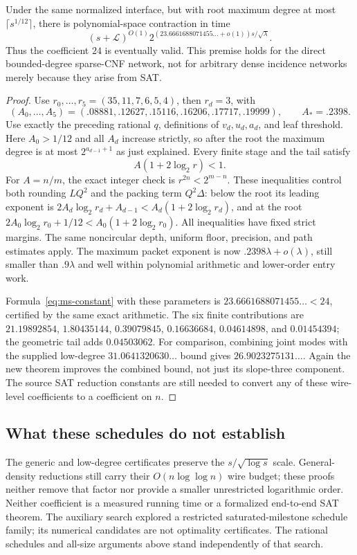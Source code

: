 \begin{theorem}
\label{thm:multistage-lowdegree}
Under the same normalized interface, but with root maximum degree at most
$\lceil s^{1/12}\rceil$, there is polynomial-space contraction in time
\[
 (s+\mathcal L)^{O(1)}
 2^{(23.6661688071455\ldots+o(1))s/\sqrt\lambda}.
\]
Thus the coefficient $24$ is eventually valid. This premise holds for the
direct bounded-degree sparse-CNF network, not for arbitrary dense incidence
networks merely because they arise from SAT.
\end{theorem}

\begin{proof}
Use $r_0,\ldots,r_5=(35,11,7,6,5,4)$, then $r_d=3$, with
\[
 (A_0,\ldots,A_5)
 =(.08881,.12627,.15116,.16206,.17717,.19999),
 \qquad A_*=.2398.
\]
Use exactly the preceding rational $q$, definitions of $v_d,u_d,a_d$, and
leaf threshold. Here $A_0>1/12$ and all $A_d$ increase strictly, so after
the root the maximum degree is at most $2^{a_{d-1}+1}$ as just explained.
Every finite stage and the tail satisfy
\[
 A(1+2\log_2r)<1.
\]
For $A=n/m$, the exact integer check is $r^{2n}<2^{m-n}$.
These inequalities control both rounding $LQ^2$ and the packing term
$Q^2\Delta$: below the root its leading exponent is
$2A_d\log_2r_d+A_{d-1}<A_d(1+2\log_2r_d)$, and at the root
$2A_0\log_2r_0+1/12<A_0(1+2\log_2r_0)$.
All inequalities have fixed strict margins. The same noncircular depth,
uniform floor, precision, and path estimates apply. The maximum packet
exponent is now $.2398\lambda+o(\lambda)$, still smaller than $.9\lambda$
and well within polynomial arithmetic and lower-order entry work.

Formula~\eqref{eq:ms-constant} with these parameters is
$23.6661688071455\ldots<24$, certified by the same exact arithmetic.
The six finite contributions are $21.19892854$, $1.80435144$,
$0.39079845$, $0.16636684$, $0.04614898$, and $0.01454394$; the
geometric tail adds $0.04503062$.
For comparison, combining joint modes with the supplied low-degree
$31.0641320630\ldots$ bound gives $26.9023275131\ldots$.
Again the new theorem improves the combined bound, not just its slope-three
component. The source SAT reduction constants are still needed to convert
any of these wire-level coefficients to a coefficient on $n$.
\end{proof}

\subsection{What these schedules do not establish}
The generic and low-degree certificates preserve the
$s/\sqrt{\log s}$ scale. General-density reductions still carry their
$O(n\log\log n)$ wire budget; these proofs neither remove that factor nor
provide a smaller unrestricted logarithmic order. Neither coefficient is a
measured running time or a formalized end-to-end SAT theorem. The auxiliary
search explored a restricted saturated-milestone schedule family; its
numerical candidates are not optimality certificates. The rational schedules
and all-size arguments above stand independently of that search.
